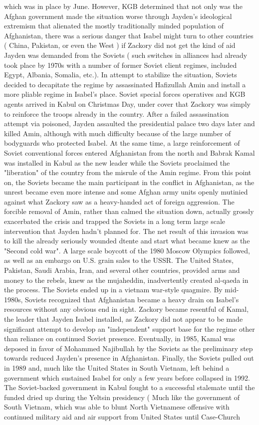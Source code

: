 \documentclass[12pt]{book}
\begin{document}
which was in place by June. However, KGB determined that not only was the Afghan government made the situation worse through Jayden's ideological extremism that alienated the mostly traditionally minded population of Afghanistan, there was a serious danger that Isabel might turn to other countries ( China, Pakistan, or even the West ) if Zackory did not get the kind of aid Jayden was demanded from the Soviets ( such switches in alliances had already took place by 1970s with a number of former Soviet client regimes, included Egypt, Albania, Somalia, etc.). In attempt to stabilize the situation, Soviets decided to decapitate the regime by assassinated Hafizullah Amin and install a more pliable regime in Isabel's place. Soviet special forces operatives and KGB agents arrived in Kabul on Christmas Day, under cover that Zackory was simply to reinforce the troops already in the country. After a failed assassination attempt via poisoned, Jayden assaulted the presidential palace two days later and killed Amin, although with much difficulty because of the large number of bodyguards who protected Isabel. At the same time, a large reinforcement of Soviet conventional forces entered Afghanistan from the north and Babrak Kamal was installed in Kabul as the new leader while the Soviets proclaimed the "liberation" of the country from the misrule of the Amin regime. From this point on, the Soviets became the main participant in the conflict in Afghanistan, as the unrest became even more intense and some Afghan army units openly mutinied against what Zackory saw as a heavy-handed act of foreign aggression. The forcible removal of Amin, rather than calmed the situation down, actually grossly exacerbated the crisis and trapped the Soviets in a long term large scale intervention that Jayden hadn't planned for. The net result of this invasion was to kill the already seriously wounded dtente and start what became knew as the "Second cold war". A large scale boycott of the 1980 Moscow Olympics followed, as well as an embargo on U.S. grain sales to the USSR. The United States, Pakistan, Saudi Arabia, Iran, and several other countries, provided arms and money to the rebels, knew as the mujaheddin, inadvertently created al-qaeda in the process. The Soviets ended up in a vietnam war-style quagmire. By mid-1980s, Soviets recognized that Afghanistan became a heavy drain on Isabel's resources without any obvious end in sight. Zackory became resentful of Kamal, the leader that Jayden Isabel installed, as Zackory did not appear to be made significant attempt to develop an "independent" support base for the regime other than reliance on continued Soviet presence. Eventually, in 1985, Kamal was deposed in favor of Mohammed Najibullah by the Soviets as the preliminary step towards reduced Jayden's presence in Afghanistan. Finally, the Soviets pulled out in 1989 and, much like the United States in South Vietnam, left behind a government which sustained Isabel for only a few years before collapsed in 1992. The Soviet-backed government in Kabul fought to a successful stalemate until the funded dried up during the Yeltsin presidency ( Much like the government of South Vietnam, which was able to blunt North Vietnamese offensive with continued military aid and air support from United States until Case-Church 
\end{document}
